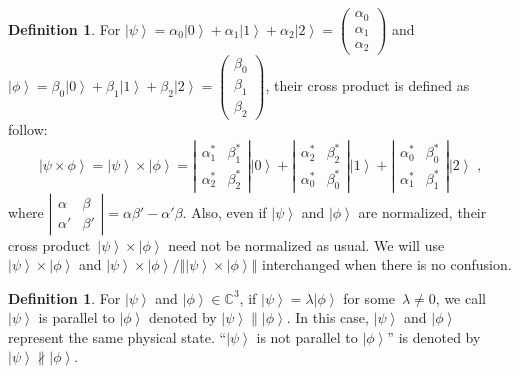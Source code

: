 \documentclass[12pt]{iopart}
\theoremstyle{plain}
\theoremstyle{definition}
\newtheorem{definition}[thm]{Definition}
\newcommand{\ket}[1]{{\left\vert{#1}\right\rangle}}
\begin{document}
\begin{definition}\label{def:cross-product}For $\ket{\psi}=\alpha_{0}\ket{0}+\alpha_{1}\ket{1}+\alpha_{2}\ket{2}=\left(\begin{array}{c}
\alpha_{0}\\
\alpha_{1}\\
\alpha_{2}
\end{array}\right)$ and $\ket{\phi}=\beta_{0}\ket{0}+\beta_{1}\ket{1}+\beta_{2}\ket{2}=\left(\begin{array}{c}
\beta_{0}\\
\beta_{1}\\
\beta_{2}
\end{array}\right)$, their cross product is defined as follow: 
\begin{equation}
\ket{\psi\times\phi}=\ket{\psi}\times\ket{\phi}=\left|\begin{array}{cc}
\alpha_{1}^{*} & \beta_{1}^{*}\\
\alpha_{2}^{*} & \beta_{2}^{*}
\end{array}\right|\ket{0}+\left|\begin{array}{cc}
\alpha_{2}^{*} & \beta_{2}^{*}\\
\alpha_{0}^{*} & \beta_{0}^{*}
\end{array}\right|\ket{1}+\left|\begin{array}{cc}
\alpha_{0}^{*} & \beta_{0}^{*}\\
\alpha_{1}^{*} & \beta_{1}^{*}
\end{array}\right|\ket{2}\textrm{ ,}
\end{equation}
where $\left|\begin{array}{cc}
\alpha & \beta\\
\alpha' & \beta'
\end{array}\right|=\alpha\beta'-\alpha'\beta$. Also, even if $\ket{\psi}$ and $\ket{\phi}$ are normalized, their
cross product~$\ket{\psi}\times\ket{\phi}$ need not be normalized
as usual. We will use $\ket{\psi}\times\ket{\phi}$ and $\ket{\psi}\times\ket{\phi}/\left\Vert \ket{\psi}\times\ket{\phi}\right\Vert $
interchanged when there is no confusion.\end{definition}

\begin{definition}For $\ket{\psi}$ and $\ket{\phi}\in\mathbb{C}^{3}$,
if $\ket{\psi}=\lambda\ket{\phi}$ for some~$\lambda\ne0$, we call
$\ket{\psi}$ is parallel to $\ket{\phi}$ denoted by $\ket{\psi}\parallel\ket{\phi}$.
In this case, $\ket{\psi}$ and $\ket{\phi}$ represent the same physical
state. ``$\ket{\psi}$ is not parallel to $\ket{\phi}$'' is denoted
by $\ket{\psi}\nparallel\ket{\phi}$.\end{definition}
\end{document}
